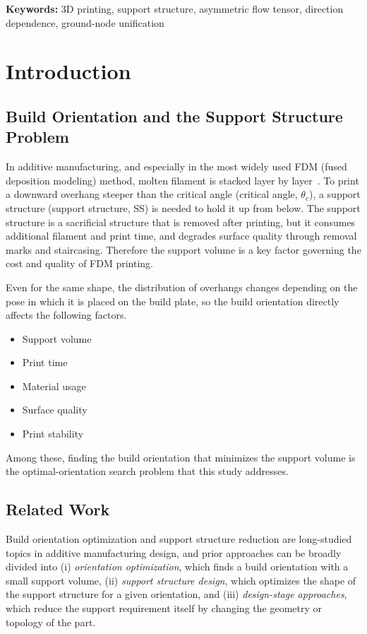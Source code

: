 \documentclass[11pt,a4paper]{article}
\begin{document}
\noindent\textbf{Keywords:} 3D printing, support structure, asymmetric flow tensor, direction dependence, ground-node unification

\section{Introduction}

\subsection{Build Orientation and the Support Structure Problem}

In additive manufacturing, and especially in the most widely used FDM (fused deposition modeling) method,
molten filament is stacked layer by layer~\cite{gibson}.
To print a downward overhang steeper than the critical angle (critical angle, $\theta_c$),
a support structure (support structure, SS) is needed to hold it up from below.
The support structure is a sacrificial structure that is removed after printing, but it consumes additional filament and print time,
and degrades surface quality through removal marks and staircasing.
Therefore the support volume is a key factor governing the cost and quality of FDM printing.

Even for the same shape, the distribution of overhangs changes depending on the pose in which it is placed on the build plate,
so the build orientation directly affects the following factors.

\begin{itemize}
\item Support volume
\item Print time
\item Material usage
\item Surface quality
\item Print stability
\end{itemize}

Among these, finding the build orientation that minimizes the support volume is the optimal-orientation search problem that this study addresses.

\subsection{Related Work}
\label{sec:related}

Build orientation optimization and support structure reduction are long-studied topics in additive manufacturing design,
and prior approaches can be broadly divided into (i) \emph{orientation optimization}, which finds a build orientation with a small support volume,
(ii) \emph{support structure design}, which optimizes the shape of the support structure for a given orientation,
and (iii) \emph{design-stage approaches}, which reduce the support requirement itself by changing the geometry or topology of the part.
\end{document}
